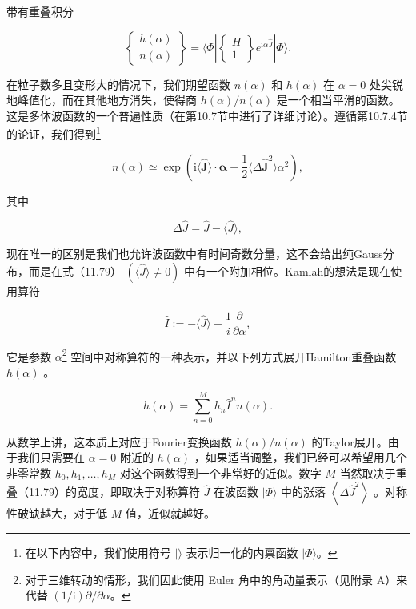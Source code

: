带有重叠积分

\[
\left\{ \begin{matrix}h\left(\alpha\right)\\
n\left(\alpha\right)
\end{matrix}\right\} =\langle\Phi\left|{\left\{ \begin{matrix}H\\
1
\end{matrix}\right\} {e}^{{\mathrm{i}\alpha}\widehat{J}}}\right|\Phi\rangle.\tag{11.78}
\]

在粒子数多且变形大的情况下，我们期望函数 $n\left(\alpha\right)$ 和 $h\left(\alpha\right)$
在 $\alpha=0$ 处尖锐地峰值化，而在其他地方消失，使得商 $h\left(\alpha\right)/n\left(\alpha\right)$
是一个相当平滑的函数。这是多体波函数的一个普遍性质（在第10.7节中进行了详细讨论）。遵循第10.7.4节的论证，我们得到\footnote{在以下内容中，我们使用符号 $|\rangle$ 表示归一化的内禀函数 $|\Phi\rangle$。}

\[
n(\alpha)\simeq\exp\left(\mathrm{i}\langle\hat{\boldsymbol{J}}\rangle\cdot\boldsymbol{\alpha}-\frac{1}{2}\langle\Delta\hat{\boldsymbol{J}}^{2}\rangle\alpha^{2}\right),\tag{11.79}
\]

其中

\[
\Delta\widehat{J}=\widehat{J}-\langle\widehat{J}\rangle,
\]

现在唯一的区别是我们也允许波函数中有时间奇数分量，这不会给出纯Gauss分布，而是在式（11.79） $\left({\langle\widehat{J}\rangle\neq0}\right)$
中有一个附加相位。Kamlah的想法是现在使用算符

\[
\widehat{I}\mathrel{\text{ := }}-\langle\widehat{J}\rangle+\frac{1}{i}\frac{\partial}{\partial\alpha},
\]

它是参数 $\alpha$\footnote{对于三维转动的情形，我们因此使用 Euler 角中的角动量表示（见附录 A）来代替 $(1/\mathrm{i})\partial/\partial\alpha$。}
空间中对称算符的一种表示，并以下列方式展开Hamilton重叠函数 $h\left(\alpha\right)$ 。

\[
h\left(\alpha\right)=\mathop{\sum}\limits^{M}_{{n=0}}{h}_{n}{\widehat{I}}^{n}n\left(\alpha\right).\tag{11.80}
\]

从数学上讲，这本质上对应于Fourier变换函数 $h\left(\alpha\right)/n\left(\alpha\right)$
的Taylor展开。由于我们只需要在 $\alpha=0$ 附近的 $h\left(\alpha\right)$ ，如果适当调整，我们已经可以希望用几个非零常数
${h}_{0},{h}_{1},\ldots,{h}_{M}$ 对这个函数得到一个非常好的近似。数字 $M$ 当然取决于重叠（11.79）的宽度，即取决于对称算符
$\widehat{J}$ 在波函数 $|\Phi\rangle$ 中的涨落 $\left\langle {\Delta{\widehat{J}}^{2}}\right\rangle $
。对称性破缺越大，对于低 $M$ 值，近似就越好。

